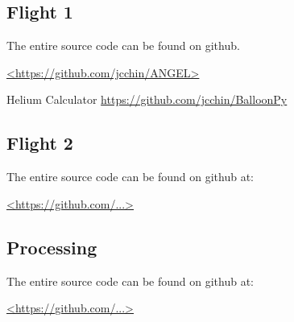 \documentclass[heading.tex]{subfiles}
\begin{document}
\newpage
\appendix

\subsection{Flight 1} \label{app:Github1} 

The entire source code can be found on github.

\url{<https://github.com/jcchin/ANGEL>}

Helium Calculator
\url{https://github.com/jcchin/BalloonPy}

\subsection{Flight 2} \label{app:Github2} 

The entire source code can be found on github at:

\url{<https://github.com/...>}

\subsection{Processing} \label{app:Github3} 

The entire source code can be found on github at:

\url{<https://github.com/...>}


\end{document}
